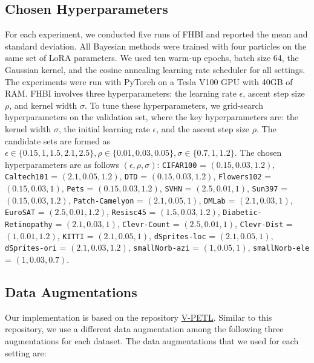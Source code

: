 \subsection{Chosen Hyperparameters}
For each experiment, we conducted five runs of FHBI and reported the mean and standard deviation. All Bayesian methods were trained with four particles on the same set of LoRA parameters. We used ten warm-up epochs, batch size 64, the Gaussian kernel, and the cosine annealing learning rate scheduler for all settings. The experiments were run with PyTorch on a Tesla V100 GPU with 40GB of RAM. FHBI involves three hyperparameters: the learning rate $\epsilon$, ascent step size $\rho$, and kernel width $\sigma$. To tune these hyperparameters, we grid-search hyperparameters on the validation set, where the key hyperparameters are: the kernel width $\sigma$, the initial learning rate $\epsilon$, and the ascent step size $\rho$. The candidate sets are formed as $\epsilon \in \{0.15, 1, 1.5, 2.1, 2.5\}, \rho \in \{0.01, 0.03, 0.05\}, \sigma \in \{0.7, 1, 1.2\}$. The chosen hyperparameters are as follows $(\epsilon, \rho, \sigma)$: \texttt{CIFAR100} = $(0.15, 0.03, 1.2)$, \texttt{Caltech101} = $(2.1, 0.05, 1.2)$, \texttt{DTD} = $(0.15, 0.03, 1.2)$, \texttt{Flowers102} = $(0.15, 0.03, 1)$, \texttt{Pets} = $(0.15, 0.03, 1.2)$, \texttt{SVHN} = $(2.5, 0.01, 1)$, \texttt{Sun397} = $(0.15, 0.03, 1.2)$, \texttt{Patch-Camelyon} = $(2.1, 0.05, 1)$, \texttt{DMLab} = $(2.1, 0.03, 1)$, \texttt{EuroSAT} = $(2.5, 0.01, 1.2)$, \texttt{Resisc45} = $(1.5, 0.03, 1.2)$, \texttt{Diabetic- Retinopathy} = $(2.1, 0.03, 1)$, \texttt{Clevr-Count} = $(2.5, 0.01, 1)$, \texttt{Clevr-Dist} = $(1, 0.01, 1.2)$, \texttt{KITTI} = $(2.1, 0.05, 1)$, \texttt{dSprites-loc} = $(2.1, 0.05, 1)$, \texttt{dSprites-ori} = $(2.1, 0.03, 1.2)$, \texttt{smallNorb-azi} = $(1, 0.05, 1)$, \texttt{smallNorb-ele} = $(1, 0.03, 0.7)$.

\subsection{Data Augmentations}
Our implementation is based on the repository \href{https://github.com/synbol/Parameter-Efficient-Transfer-Learning-Benchmark/tree/main}{V-PETL}. Similar to this repository, we use a different data augmentation among the following three augmentations for each dataset. The data augmentations that we used for each setting are: 

